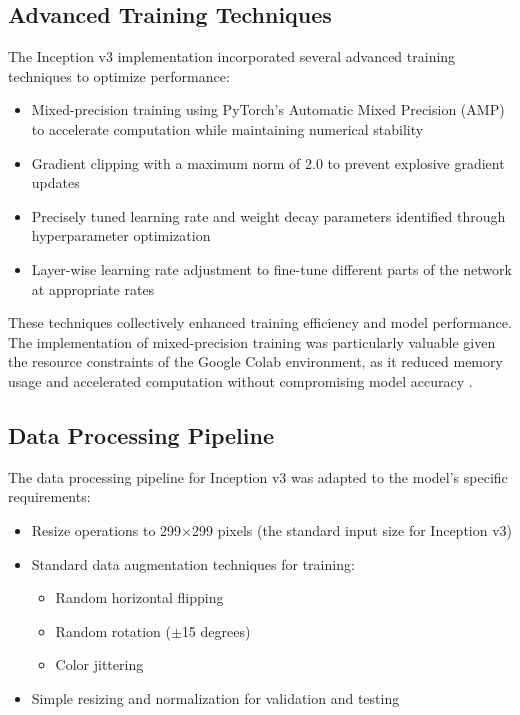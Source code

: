 \documentclass[a4paper,12pt]{article}
\begin{document}
\subsection{Advanced Training Techniques}

The Inception v3 implementation incorporated several advanced training techniques to optimize performance:

\begin{itemize}
    \item Mixed-precision training using PyTorch's Automatic Mixed Precision (AMP) to accelerate computation while maintaining numerical stability \citep{micikevicius2018mixed}
    \item Gradient clipping with a maximum norm of 2.0 to prevent explosive gradient updates \citep{you2019large}
    \item Precisely tuned learning rate and weight decay parameters identified through hyperparameter optimization
    \item Layer-wise learning rate adjustment to fine-tune different parts of the network at appropriate rates
\end{itemize}

These techniques collectively enhanced training efficiency and model performance. The implementation of mixed-precision training was particularly valuable given the resource constraints of the Google Colab environment, as it reduced memory usage and accelerated computation without compromising model accuracy \citep{ghani2024comprehensive}.

\subsection{Data Processing Pipeline}

The data processing pipeline for Inception v3 was adapted to the model's specific requirements:

\begin{itemize}
    \item Resize operations to 299$\times$299 pixels (the standard input size for Inception v3)
    \item Standard data augmentation techniques for training:
    \begin{itemize}
        \item Random horizontal flipping
        \item Random rotation ($\pm$15 degrees)
        \item Color jittering
    \end{itemize}
    \item Simple resizing and normalization for validation and testing
\end{itemize}
\end{document}
